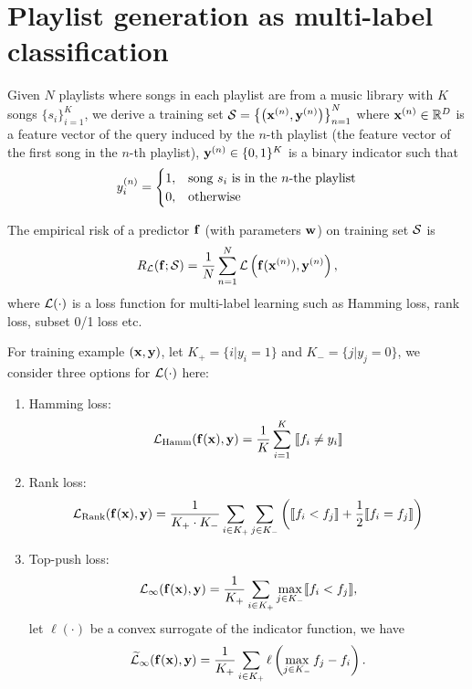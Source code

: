 \section{Playlist generation as multi-label classification}
\label{sec:playlist}


Given $N$ playlists where songs in each playlist are from a music library with $K$ songs $\{s_i\}_{i=1}^K$,
we derive a training set $\mathcal{S} = \left\{ \left( \mathbf{x}^{({n})}, \mathbf{y}^{({n})} \right) \right\}_{n=1}^N$ where $\mathbf{x}^{({n})} \in \mathbb{R}^D$ is a feature vector of the query 
induced by the $n$-th playlist (\eg the feature vector of the first song in the $n$-th playlist),
$\mathbf{y}^{({n})} \in \{0,1\}^K$ is a binary indicator such that 
$$
y_i^{({n})} = 
\begin{cases}
1, & \text{song $s_i$ is in the $n$-the playlist} \\
0, & \text{otherwise}
\end{cases}
$$

The empirical risk of a predictor $\mathbf{f}$ (with parameters $\mathbf{w}$) on training set $\mathcal{S}$ is
\begin{equation}
\label{eq:risk_pl}
R_{\mathcal{L}}(\mathbf{f}; \mathcal{S}) = \frac{1}{N} \sum_{n=1}^N \mathcal{L}\left(\mathbf{f}(\mathbf{x}^{({n})}), \mathbf{y}^{({n})}\right),
\end{equation}
where $\mathcal{L}(\cdot)$ is a loss function for multi-label learning such as Hamming loss, rank loss, subset 0/1 loss etc.

For training example $(\mathbf{x}, \mathbf{y})$, let $K_+ = \{i |y_i = 1\}$ and $K_- = \{j |y_j = 0\}$, 
we consider three options for $\mathcal{L}(\cdot)$ here:
\begin{enumerate}
\item Hamming loss: 
      \begin{equation}
      \label{eq:loss_hamm_pl0}
      \mathcal{L}_\text{Hamm}(\mathbf{f}(\mathbf{x}), \mathbf{y}) = \frac{1}{K} \sum_{i=1}^K \; \llbracket f_i \ne y_i \rrbracket
      \end{equation}
\item Rank loss: 
      \begin{equation}
      \label{eq:loss_rank_pl0}
      \mathcal{L}_\text{Rank}(\mathbf{f}(\mathbf{x}), \mathbf{y}) = \frac{1}{K_+ \cdot K_-} \sum_{i \in K_+} \sum_{j \in K_-} 
                                      \left( \llbracket f_i < f_j \rrbracket + \frac{1}{2} \llbracket f_i = f_j \rrbracket \right)
      \end{equation}

\item Top-push loss:
      $$\mathcal{L}_\infty(\mathbf{f}(\mathbf{x}), \mathbf{y}) = \frac{1}{K_+} \sum_{i \in K_+} \max_{j \in K_-} \llbracket f_i < f_j \rrbracket,$$
      let $\ell(\cdot)$ be a convex surrogate of the indicator function, we have
      \begin{equation}
      \label{eq:loss_inf_pl}
      \widetilde{\mathcal{L}}_\infty(\mathbf{f}(\mathbf{x}), \mathbf{y}) = \frac{1}{K_+} \sum_{i \in K_+} \ell\left( \max_{j \in K_-} f_j - f_i \right).
      \end{equation}
\end{enumerate}

